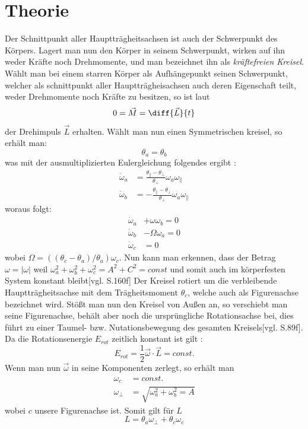 \documentclass{include/protokollclass}
\begin{document}
    \section{Theorie}
     Der Schnittpunkt aller Hauptträgheitsachsen ist auch der Schwerpunkt des Körpers. Lagert man nun den Körper in seinem Schwerpunkt, wirken auf ihn weder Kräfte noch Drehmomente, und man bezeichnet ihn als \textit{kräftefreien Kreisel}.
   Wählt man bei einem starren Körper als Aufhängepunkt seinen Schwerpunkt, welcher als schnittpunkt aller Hauptträgheisachsen auch deren Eigenschaft teilt, weder Drehmomente noch Kräfte zu besitzen, so ist laut \begin{equation}
        0=\vec{M}=\diff{\vec{L}}{t}
    \end{equation}
    der Drehimpuls $\vec{L}$ erhalten. Wählt man nun einen Symmetrischen kreisel, so erhält man:
    \begin{equation}
        \theta_a = \theta_b
    \end{equation}
    was mit der ausmultiplizierten Eulergleichung folgendes ergibt : 
    \begin{align}
        \dot{\omega}_a&=\frac{\theta_{\parallel}-\theta_{\perp}}{\theta_{\perp}}\omega_a\omega_{\parallel}\\
        \dot{\omega}_b &=-\frac{\theta_{\parallel}-\theta_{\perp}}{\theta_ {\perp}}\omega_a\omega_{\parallel}
    \end{align}
    woraus folgt:
    \begin{align}
        \dot{\omega}_a&+\omega\omega_b =0\\
        \nonumber\dot{\omega}_b&-\Omega\omega_a=0\\
        \nonumber\dot{\omega}_c&=0
    \end{align}
    wobei $\Omega = ((\theta_c-\theta_a)/\theta_a)\omega_c$. Nun kann man erkennen, dass der Betrag $\omega=|\omega|$ weil $\omega_a^2+\omega_b^2+\omega_c^2=A^2+C^2 = const$ und somit auch im körperfesten System konstant bleibt\cite{Demtroeder2017}[vgl. S.160f]
    Der Kreisel rotiert um die verbleibende Hauptträgheitsachse mit dem Trägheitsmoment $\theta_c$, welche auch als Figurenachse bezeichnet wird. Stößt man nun den Kreisel von Außen an, so verschiebt man seine Figurenachse, behält aber noch die ursprüngliche Rotationsachse bei, dies führt zu einer Taumel- bzw. Nutationsbewegung des gesamten Kreisels\cite{Meschede2015}[vgl. S.89f]. Da die Rotationsenergie $E_{rot}$ zeitlich konstant ist gilt : 
    \begin{equation}
        E_{rot}=\frac{1}{2}\vec{\omega}\cdot\vec{L}=const.
    \end{equation}
    Wenn man nun $\vec{\omega}$ in seine Komponenten zerlegt, so erhält man \begin{align}
        \omega_c &= const.\\
        \nonumber\omega_{\perp}&=\sqrt{\omega_a^2+\omega_b^2=A}
    \end{align}
    wobei $c$ unsere Figurenachse ist. Somit gilt für $L$
    \begin{equation}\label{eq:3.8}
        L=\theta_a\omega_{\perp}+\theta_c\omega_c
    \end{equation}
    
\end{document}
